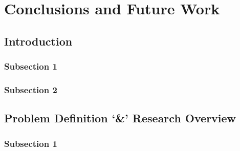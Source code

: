 
\chapter{Conclusions and Future Work} %

\label{Chapter6} %



\section{Introduction}


\subsection{Subsection 1}



\subsection{Subsection 2}




\section{Problem Definition `\&' Research Overview}



\subsection{Subsection 1}




